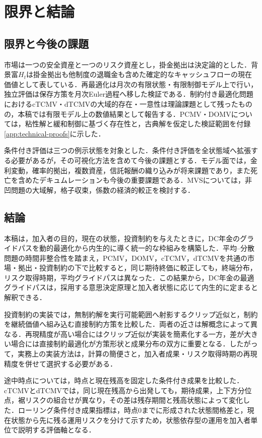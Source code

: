 \documentclass[10pt,a4paper]{article}
\theoremstyle{plain}
\theoremstyle{definition}
\begin{document}
\section{限界と結論}\label{sec:conclusion}
\subsection{限界と今後の課題}
市場は一つの安全資産と一つのリスク資産とし，掛金拠出は決定論的とした．背景富$H_t$は掛金拠出も他制度の退職金も含めた確定的なキャッシュフローの現在価値として表している．再最適化は月次の有限状態・有限制御モデル上で行い，独立評価は保存方策を月次Euler過程へ移した検証である．制約付き最適化問題におけるcTCMV・dTCMVの大域的存在・一意性は理論課題として残ったものの，本稿では有限モデル上の数値結果として報告する．PCMV・DOMVについては，粘性解と緩和制御に基づく存在性と，古典解を仮定した検証範囲を付録\ref{app:technical-proofs}に示した．

条件付き評価は三つの例示状態を対象とした．条件付き評価を全状態域へ拡張する必要があるが，その可視化方法を含めて今後の課題とする．モデル面では，金利変動，確率的拠出，複数資産，信託報酬の織り込みが将来課題であり，また死亡を含めたデキュムレーションも今後の重要課題である．MVSについては，非凹問題の大域解，格子収束，係数の経済的較正を検討する．

\subsection{結論}
本稿は，加入者の目的，現在の状態，投資制約を与えたときに，DC年金のグライドパスを動的最適化から内生的に導く統一的な枠組みを構築した．平均--分散問題の時間非整合性を踏まえ，PCMV，DOMV，cTCMV，dTCMVを共通の市場・拠出・投資制約の下で比較すると，同じ期待終価に較正しても，終端分布，リスク取得時期，平均グライドパスは異なった．この結果から，DC年金の最適グライドパスは，採用する意思決定原理と加入者状態に応じて内生的に定まると解釈できる．

投資制約の実装では，無制約解を実行可能範囲へ射影するクリップ近似と，制約を継続価値へ組み込む直接制約方策を比較した．両者の近さは解概念によって異なる．再現精度が高い場合にはクリップ近似が実装を簡素化する一方，差が大きい場合には直接制約最適化が方策形状と成果分布の双方に重要となる．したがって，実務上の実装方法は，計算の簡便さと，加入者成果・リスク取得時期の再現精度を併せて選択する必要がある．

途中時点については，時点と現在残高を固定した条件付き成果を比較した．cTCMVとdTCMVでは，同じ現在残高から出発しても，期待成果，上下方分位点，裾リスクの組合せが異なり，その差は残存期間と残高状態によって変化した．ローリング条件付き成果指標は，時点0までに形成された状態間格差と，現在状態から先に残る運用リスクを分けて示すため，状態依存型の運用を加入者単位で説明する評価軸となる．
\end{document}
